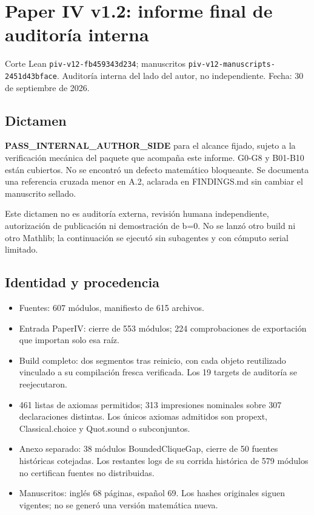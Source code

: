 \section{Paper IV v1.2: informe final de auditoría
interna}\label{paper-iv-v1.2-informe-final-de-auditoruxeda-interna}

Corte Lean \texttt{piv-v12-fb459343d234}; manuscritos
\texttt{piv-v12-manuscripts-2451d43bface}. Auditoría interna del lado
del autor, no independiente. Fecha: 30 de septiembre de 2026.

\subsection{Dictamen}\label{dictamen}

\textbf{PASS\_INTERNAL\_AUTHOR\_SIDE} para el alcance fijado, sujeto a
la verificación mecánica del paquete que acompaña este informe. G0-G8 y
B01-B10 están cubiertos. No se encontró un defecto matemático
bloqueante. Se documenta una referencia cruzada menor en A.2, aclarada
en FINDINGS.md sin cambiar el manuscrito sellado.

Este dictamen no es auditoría externa, revisión humana independiente,
autorización de publicación ni demostración de b=0. No se lanzó otro
build ni otro Mathlib; la continuación se ejecutó sin subagentes y con
cómputo serial limitado.

\subsection{Identidad y procedencia}\label{identidad-y-procedencia}

\begin{itemize}
\tightlist
\item
  Fuentes: 607 módulos, manifiesto de 615 archivos.
\item
  Entrada PaperIV: cierre de 553 módulos; 224 comprobaciones de
  exportación que importan solo esa raíz.
\item
  Build completo: dos segmentos tras reinicio, con cada objeto
  reutilizado vinculado a su compilación fresca verificada. Los 19
  targets de auditoría se reejecutaron.
\item
  461 listas de axiomas permitidos; 313 impresiones nominales sobre 307
  declaraciones distintas. Los únicos axiomas admitidos son propext,
  Classical.choice y Quot.sound o subconjuntos.
\item
  Anexo separado: 38 módulos BoundedCliqueGap, cierre de 50 fuentes
  históricas cotejadas. Los restantes logs de su corrida histórica de
  579 módulos no certifican fuentes no distribuidas.
\item
  Manuscritos: inglés 68 páginas, español 69. Los hashes originales
  siguen vigentes; no se generó una versión matemática nueva.
\end{itemize}

